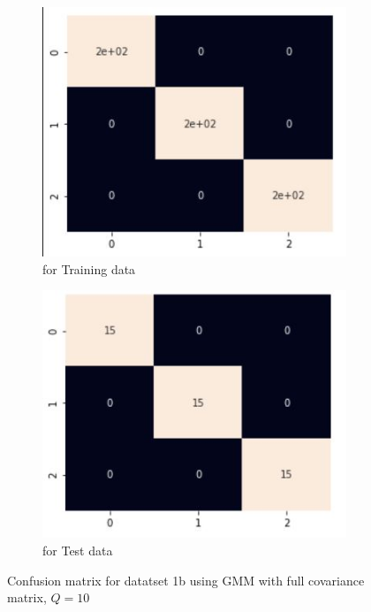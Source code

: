 \documentclass[11pt]{article}
\begin{document}
\begin{figure}[h]
\centering
	\begin{subfigure}[b]{0.45\textwidth}
	\centering
	\includegraphics[scale=0.5]{dataset1b_gmm_full_hm_train.jpg}
	\caption{for Training data}
	\label{fig:fig2.2.3.1}
	\end{subfigure}
	\hfill
	\begin{subfigure}[b]{0.45\textwidth}
	\centering
	\includegraphics[scale=0.5]{dataset1b_gmm_full_hm_test.jpg}
	\caption{for Test data}
	\label{fig:fig2.2.3.2}
	\end{subfigure}
\caption{Confusion matrix for datatset 1b using GMM with full covariance matrix, $Q= 10$}
\label{fig:fig1.2.1}
\end{figure}
\end{document}
